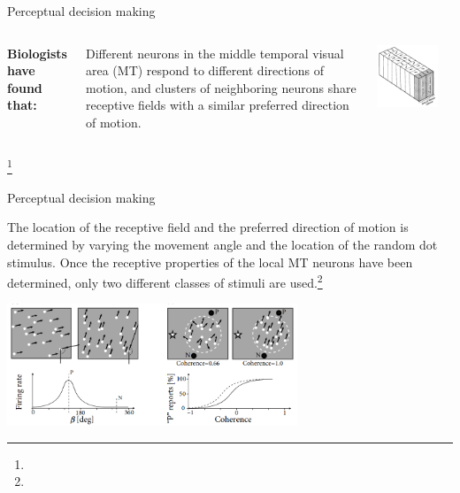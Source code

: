 \documentclass[xcolor=table,dvipsnames,svgnames,aspectratio=169,fontset=fandol]{ctexbeamer}
\begin{document}
\begin{frame}{Perceptual decision making}
  \begin{columns}
    \textbf{Biologists have found that:}

    \vskip 8pt
    Different neurons in the middle temporal visual area (MT) respond to different directions of motion, and clusters of neighboring neurons share receptive fields with a similar preferred direction of motion. 

    \includegraphics[width=0.8\textwidth,height=0.65\textheight]{mt.png}
  \end{columns}\footnote{}
\end{frame}

\begin{frame}{Perceptual decision making}

  The location of the receptive field and the preferred direction of motion is determined by varying the movement angle and the location of the random dot stimulus. Once the receptive properties of the local MT neurons have been determined, only two different classes of stimuli are used.\footnote{}
  \begin{center}
    \includegraphics[width=0.65\textwidth,height=0.45\textheight]{monkey2.png}
  \end{center}
\end{frame}
\end{document}
